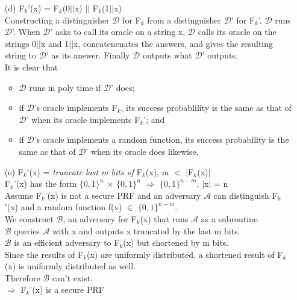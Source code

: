 \begin{itemize}
\item[(d)]
	F\(_{k}\)'(x) =  F\(_{k}\)(0\(\vert \vert\)x) \(\vert \vert\) F\(_{k}\)(1\(\vert \vert\)x) \\
	Constructing a distinguisher \(\mathcal{D}\) for F\(_{k}\) from a distinguisher \(\mathcal{D}\)' for F\(_{k}\)'. \(\mathcal{D}\) runs \(\mathcal{D}\)'. 
	When \(\mathcal{D}\)' asks to call its oracle on a string x, \(\mathcal{D}\) calls its oracle on the strings 0\(\vert \vert\)x and 1\(\vert \vert\)x, concatenenates
	the answers, and gives the resulting string to \(\mathcal{D}\)' as its answer. Finally \(\mathcal{D}\) outputs what  \(\mathcal{D}\)' outputs. \\
	It is clear that
	\begin{itemize}
		\item \(\mathcal{D}\) runs in poly time if \(\mathcal{D}\)' does;
		\item if \(\mathcal{D}\)'s oracle implements F\(_{k}\), its success probablility is the same as that of  \(\mathcal{D}\)' when its oracle implements F\(_{k}\)'; and
		\item if  \(\mathcal{D}\)'s oracle implements a random function, its success probability is the same as that of  \(\mathcal{D}\)' when its oracle does likewise.
	\end{itemize}
\item[(e)]
	F\(_{k}\)'(x)  = \textit{truncate last m bits of}  F\(_{k}\)(x), m \(<\) \(\vert\)F\(_{k}\)(x)\(\vert\) \\
	F\(_{k}\)'(x) has the form \(\{0,1\}^{n}\) \(\times\) \(\{0,1\}^{n}\) \(\Rightarrow\) \(\{0,1\}^{n-m}\), \(\vert\)x\(\vert\) = n \\
	Assume F\(_{k}\)'(x) is not a secure PRF and an adversary \(\mathcal{A}\) can distinguish F\(_{k}\)'(x) and a random function f(x) \(\in\) \(\{0,1\}^{n-m}\). \\
	We construct \(\mathcal{B}\), an adversary for F\(_{k}\)(x) that runs \(\mathcal{A}\) as a subroutine.\\
	\(\mathcal{B}\) queries \(\mathcal{A}\) with x and outputs x truncated by the last m bits. \\
	\(\mathcal{B}\) is an efficient adversary to F\(_{k}\)(x) but shortened by m bits.\\
	Since the results of F\(_{k}\)(x) are uniformly distributed, a shortened result of F\(_{k}\)(x) is uniformly distributed as well. \\
	Therefore \(\mathcal{B}\) can't exist. \\
	\(\Rightarrow\) F\(_{k}\)'(x) is a secure PRF \\
\end{itemize}